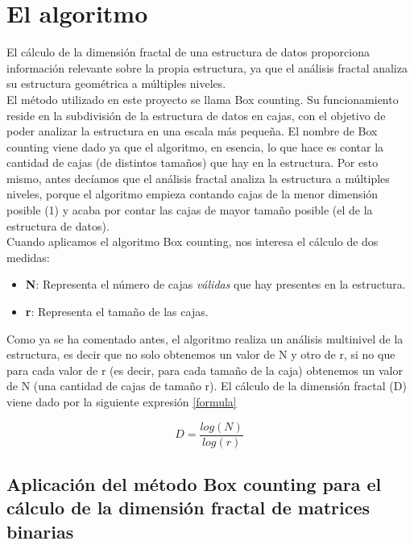 \chapter{El algoritmo}

El cálculo de la dimensión fractal de una estructura de datos proporciona información relevante sobre la propia estructura, ya que el análisis fractal analiza su estructura geométrica a múltiples niveles.\\

El método utilizado en este proyecto se llama Box counting. Su funcionamiento reside en la subdivisión de la estructura de datos en cajas, con el objetivo de poder analizar la estructura en una escala más pequeña. El nombre de Box counting viene dado ya que el algoritmo, en esencia, lo que hace es contar la cantidad de cajas (de distintos tamaños) que hay en la estructura. Por esto mismo, antes decíamos que el análisis fractal analiza la estructura a múltiples niveles, porque el algoritmo empieza contando cajas de la menor dimensión posible (1) y acaba por contar las cajas de mayor tamaño posible (el de la estructura de datos).\\

Cuando aplicamos el algoritmo Box counting, nos interesa el cálculo de dos medidas:


\begin{itemize}
    \item \textbf{N}: Representa el número de cajas \textit{válidas} que hay presentes en la estructura.
    \item \textbf{r}: Representa el tamaño de las cajas. 
\end{itemize}
 
Como ya se ha comentado antes, el algoritmo realiza un análisis multinivel de la estructura, es decir que no solo obtenemos un valor de N y otro de r, si no que para cada valor de r (es decir, para cada tamaño de la caja) obtenemos un valor de N (una cantidad de cajas de tamaño r). El cálculo de la dimensión fractal (D) viene dado por la siguiente expresión \ref{formula}

\begin{equation}
    \label{formula}
    D = \frac{log(N)}{log(r)}
\end{equation}

\section{Aplicación del método Box counting para el cálculo de la dimensión fractal de matrices binarias}

